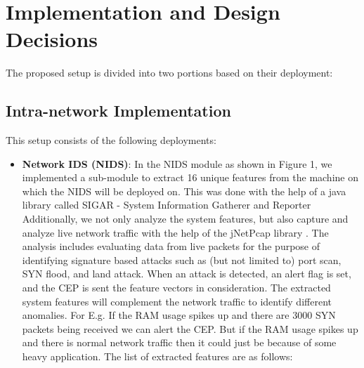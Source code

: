 \documentclass[conference]{sig-alternate-05-2015}
\begin{document}
\section{Implementation and Design Decisions}\label{subsec:implementation}
The proposed setup is divided into two portions based on their deployment:
\subsection{Intra-network Implementation}
This setup consists of the following deployments:
\begin{itemize}
  \item \textbf{Network IDS (NIDS)}: 
  In the NIDS module as shown in Figure 1, we implemented a sub-module to extract 16 unique features from the machine on which the NIDS will be deployed on. This was done with the help of a java library called SIGAR - System Information Gatherer and   Reporter \cite{sigar} Additionally, we not only analyze the system features, but also capture and   analyze live network traffic with the help of the jNetPcap library \cite{jnetpcap}. The analysis includes evaluating data from live packets for the purpose of identifying signature based attacks such as (but not limited to) port scan, SYN flood, and land attack. When an attack is detected, an alert flag is set, and the CEP is sent the feature vectors in consideration. The extracted system features will complement the network traffic to identify different anomalies. For E.g. If the RAM usage spikes up and there are 3000 SYN packets being received we can alert the CEP. But if the RAM usage spikes up and there is normal network traffic then it could just be because of some heavy application. The list of extracted features are as follows: 



\end{itemize}
\end{document}
